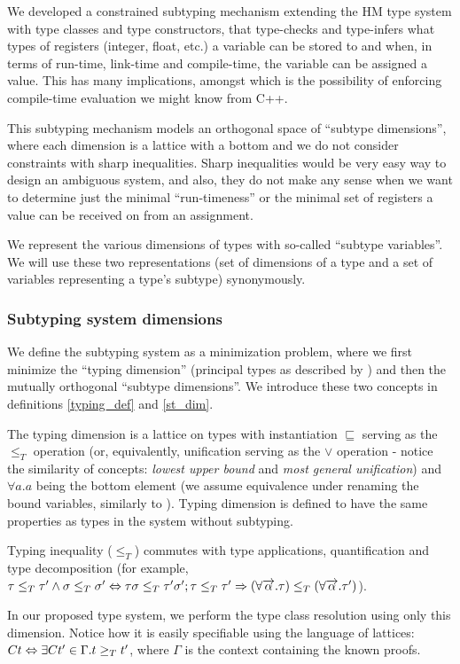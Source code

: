 We developed a constrained subtyping mechanism extending the HM type system with type classes and type constructors, that type-checks and type-infers what types of registers (integer, float, etc.) a variable can be stored to and when, in terms of run-time, link-time and compile-time, the variable can be assigned a value. This has many implications, amongst which is the possibility of enforcing compile-time evaluation we might know from C++.

This subtyping mechanism models an orthogonal space of ``subtype dimensions'', where each dimension is a lattice with a bottom and we do not consider constraints with sharp inequalities. Sharp inequalities would be very easy way to design an ambiguous system, and also, they do not make any sense when we want to determine just the minimal ``run-timeness'' or the minimal set of registers a value can be received on from an assignment.

We represent the various dimensions of types with so-called ``subtype variables''. We will use these two representations (set of dimensions of a type and a set of variables representing a type's subtype) synonymously.

\subsubsection{Subtyping system dimensions}

\begin{defn}
    We define the subtyping system as a minimization problem, where we first minimize the ``typing dimension'' (principal types as described by \citet{damas1982principal}) and then the mutually orthogonal ``subtype dimensions''. We introduce these two concepts in definitions \ref{typing_def} and \ref{st_dim}.
\end{defn}

\begin{defn}
    \label{typing_def}
    The typing dimension is a lattice on types with instantiation $\sqsubseteq$ serving as the $\leq_T$ operation (or, equivalently, unification serving as the $\lor$ operation - notice the similarity of concepts: \emph{lowest upper bound} and \emph{most general unification}) and $\forall a . a$ being the bottom element (we assume equivalence under renaming the bound variables, similarly to \citet{barendregt1992lambda}). Typing dimension is defined to have the same properties as types in the system without subtyping.

    Typing inequality ($\leq_T$) commutes with type applications, quantification and type decomposition (for example, $\tau \leq_T \tau' \land \sigma \leq_T \sigma' \Leftrightarrow \tau \sigma \leq_T \tau' \sigma'; \tau \leq_T \tau' \Rightarrow (\forall \overrightarrow{\alpha} . \tau) \leq_T (\forall \overrightarrow{\alpha} . \tau')$).

    In our proposed type system, we perform the type class resolution using only this dimension. Notice how it is easily specifiable using the language of lattices: $C t \Leftrightarrow \exists C t' \in \Gamma . t \geq_T t'$, where $\Gamma$ is the context containing the known proofs.
\end{defn}


